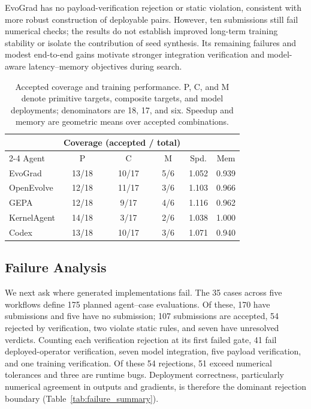 EvoGrad has no payload-verification rejection or static violation, consistent with more robust construction of deployable pairs. However, ten submissions still fail numerical checks; the results do not establish improved long-term training stability or isolate the contribution of seed synthesis. Its remaining failures and modest end-to-end gains motivate stronger integration verification and model-aware latency--memory objectives during search.


\begin{table}[t]
\centering
\caption{Accepted coverage and training performance. P, C, and M denote primitive targets, composite targets, and model deployments; denominators are 18, 17, and six. Speedup and memory are geometric means over accepted combinations.}

\label{tab:agent_tier3_results}
\footnotesize
\setlength{\tabcolsep}{2.5pt}
\begin{tabular*}{\columnwidth}{@{\extracolsep{\fill}}lccccc@{}}
\toprule
 & \multicolumn{3}{c}{Coverage (accepted / total)} & & \\
\cmidrule(lr){2-4}
Agent & P & C & M & Spd. & Mem \\
\midrule
EvoGrad & 13/18 & 10/17 & 5/6 & 1.052 & 0.939 \\
OpenEvolve & 12/18 & 11/17 & 3/6 & 1.103 & 0.966 \\
GEPA & 12/18 & 9/17 & 4/6 & 1.116 & 0.962 \\
KernelAgent & 14/18 & 3/17 & 2/6 & 1.038 & 1.000 \\
Codex & 13/18 & 10/17 & 3/6 & 1.071 & 0.940 \\
\bottomrule
\end{tabular*}
\end{table}


\subsection{Failure Analysis}

We next ask where generated implementations fail. The 35 cases across five workflows define 175 planned agent--case evaluations. Of these, 170 have submissions and five have no submission; 107 submissions are accepted, 54 rejected by verification, two violate static rules, and seven have unresolved verdicts. Counting each verification rejection at its first failed gate, 41 fail deployed-operator verification, seven model integration, five payload verification, and one training verification. Of these 54 rejections, 51 exceed numerical tolerances and three are runtime bugs. Deployment correctness, particularly numerical agreement in outputs and gradients, is therefore the dominant rejection boundary (Table~\ref{tab:failure_summary}).


